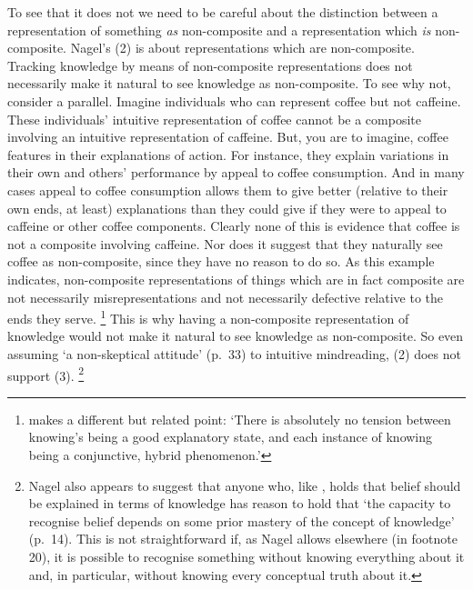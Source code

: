 \documentclass[12pt,\papersize]{extarticle}
\begin{document}
To see that it does not we need  to be careful about the distinction between 
a representation of something \emph{as} non-composite 
and
a representation which \emph{is} non-composite.
Nagel's (2) is about representations which are non-composite.
Tracking knowledge by means of non-composite representations does not necessarily make it natural to see knowledge as non-composite.
To see why not, consider a parallel.
Imagine individuals who can represent coffee but not caffeine.
These individuals' intuitive representation of coffee cannot be a composite involving an intuitive representation of caffeine.
But, you are to imagine, coffee features in their explanations of action.
For instance, they explain variations in their own and others' performance by appeal to coffee consumption.
And in many cases appeal to coffee consumption allows them to give better (relative to their own ends, at least) explanations than they could give if they were to appeal to caffeine or other coffee components.
Clearly none of this is evidence that coffee is not a composite involving caffeine.
Nor does it suggest that they naturally see coffee as non-composite, since they have no reason to do so.
As this example indicates, 
non-composite representations of things which are in fact composite are 
not necessarily misrepresentations
and
not necessarily defective relative to the ends they serve.%
\footnote{
\citet[p.\ 51]{fricker_2009} makes a different but related point: `There is absolutely no tension between knowing's being a good explanatory state, and each instance of knowing being a conjunctive, hybrid phenomenon.'
}
This is why having a non-composite representation of knowledge would not make it natural to see knowledge as  non-composite.
So even assuming `a non-skeptical attitude' (p.\ 33) to intuitive mindreading, (2) does not support (3).%
\footnote{
Nagel also appears to suggest that anyone who, like \citet{Williamson:2000xz}, holds that belief should be explained in terms of knowledge 
has reason to hold that `the capacity to recognise belief depends on some prior mastery of the concept of knowledge' (p.\ 14).
This is not straightforward if, as Nagel allows elsewhere (in footnote 20), it is possible to recognise something without knowing everything about it and, in particular, without knowing every conceptual truth about it. 
}
\end{document}
